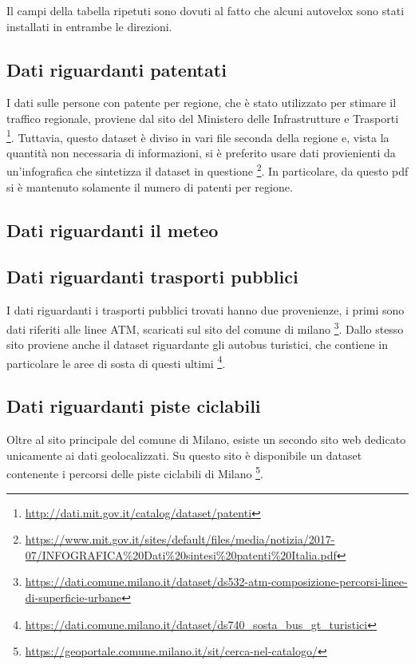 \documentclass[a4paper]{report}
\begin{document}
Il campi della tabella ripetuti sono dovuti al fatto che alcuni autovelox sono stati installati in entrambe le direzioni.

\subsection{Dati riguardanti patentati}

I dati sulle persone con patente per regione, che è stato utilizzato per stimare il traffico 
regionale, proviene dal sito del Ministero delle Infrastrutture e Trasporti 
\footnote{\url{http://dati.mit.gov.it/catalog/dataset/patenti}}.
Tuttavia, questo dataset è diviso in vari file seconda della regione e, vista la quantità 
non necessaria di informazioni, si è preferito usare dati provienienti da un'infografica che 
sintetizza il dataset in questione
\footnote{\url{https://www.mit.gov.it/sites/default/files/media/notizia/2017-07/INFOGRAFICA\%20Dati\%20sintesi\%20patenti\%20Italia.pdf}}.
In particolare, da questo pdf si è mantenuto solamente il numero di patenti per regione.

\subsection{Dati riguardanti il meteo}

\subsection{Dati riguardanti trasporti pubblici}
I dati riguardanti i trasporti pubblici trovati hanno due provenienze, i primi sono 
dati riferiti alle linee ATM, scaricati sul sito del comune di milano
\footnote{\url{https://dati.comune.milano.it/dataset/ds532-atm-composizione-percorsi-linee-di-superficie-urbane}}.
Dallo stesso sito proviene anche il dataset riguardante gli autobus turistici, che 
contiene in particolare le aree di sosta di questi ultimi
\footnote{\url{https://dati.comune.milano.it/dataset/ds740_sosta_bus_gt_turistici}}.

\subsection{Dati riguardanti piste ciclabili}
Oltre al sito principale del comune di Milano, esiste un secondo sito web dedicato 
unicamente ai dati geolocalizzati. Su questo sito è disponibile un dataset contenente 
i percorsi delle piste ciclabili di Milano
\footnote{\url{https://geoportale.comune.milano.it/sit/cerca-nel-catalogo/}}.
\end{document}
